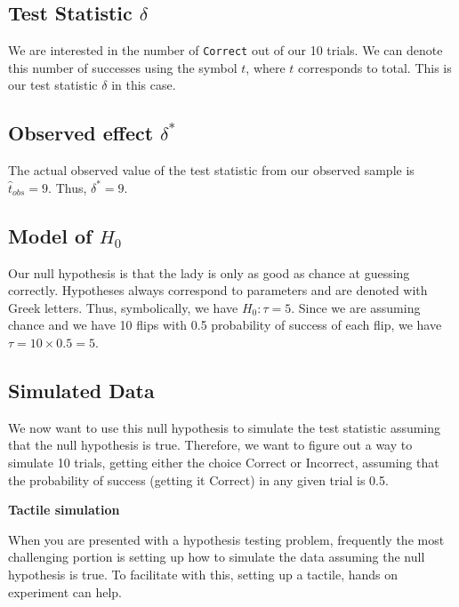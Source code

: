 \documentclass[]{tufte-book}
\begin{document}
\subsection{\texorpdfstring{Test Statistic
\(\delta\)}{Test Statistic \textbackslash{}delta}}\label{test-statistic-delta}

We are interested in the number of \texttt{Correct} out of our 10
trials. We can denote this number of successes using the symbol \(t\),
where \(t\) corresponds to total. This is our test statistic \(\delta\)
in this case.

\subsection{\texorpdfstring{Observed effect
\(\delta^*\)}{Observed effect \textbackslash{}delta\^{}*}}\label{observed-effect-delta}

The actual observed value of the test statistic from our observed sample
is \(\hat{t}_{obs} = 9\). Thus, \(\delta^* = 9\).

\subsection{\texorpdfstring{Model of
\(H_0\)}{Model of H\_0}}\label{model-of-h_0}

Our null hypothesis is that the lady is only as good as chance at
guessing correctly. Hypotheses always correspond to parameters and are
denoted with Greek letters. Thus, symbolically, we have
\(H_0: \tau = 5\). Since we are assuming chance and we have 10 flips
with 0.5 probability of success of each flip, we have
\(\tau = 10 \times 0.5 = 5\).

\subsection{Simulated Data}\label{simulated-data}

We now want to use this null hypothesis to simulate the test statistic
assuming that the null hypothesis is true. Therefore, we want to figure
out a way to simulate 10 trials, getting either the choice Correct or
Incorrect, assuming that the probability of success (getting it Correct)
in any given trial is 0.5.

\textbf{Tactile simulation}

When you are presented with a hypothesis testing problem, frequently the
most challenging portion is setting up how to simulate the data assuming
the null hypothesis is true. To facilitate with this, setting up a
tactile, hands on experiment can help.
\end{document}
